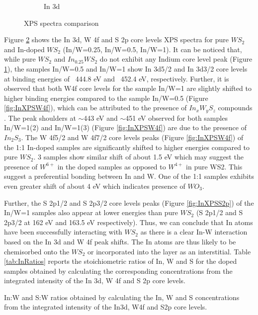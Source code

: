 \begin{figure}[!h]
\begin{center}
\begin{subfigure}[b]{0.6\textwidth}
			\caption{In 3d}
			\label{fig:InXPSIn3d}
		\end{subfigure}
		\caption{XPS spectra comparison}
		\label{fig:InXPSSpectra}
	\end{center}
\end{figure}

Figure \ref{fig:InXPSSpectra} shows the In 3d, W 4f and S 2p core levels XPS spectra for pure $WS_2$ and In-doped $WS_2$ (In/W=0.25, In/W=0.5, In/W=1). It can be noticed that, while pure $WS_2$ and $In_{0.25}WS_2$ do not exhibit any Indium core level peak (Figure \ref{fig:InXPSIn3d}), the samples In/W=0.5 and In/W=1 show In 3d5/2 and In 3d3/2 core levels at binding energies of ~444.8 eV and ~452.4 eV, respectively. Further, it is observed that both W4f core levels for the sample In/W=1 are slightly shifted to higher binding energies compared to the sample In/W=0.5 (Figure \ref{fig:InXPSW4f}), which can be attributed to the presence of $In_xW_yS_z$ compounds \cite{Wagner1991}. The peak shoulders at $\sim$443 eV and $\sim$451 eV observed for both samples In/W=1(2) and In/W=1(3) (Figure \ref{fig:InXPSW4f}) are due to the presence of $In_2S_3$. The W 4f5/2 and W 4f7/2 core levels peaks (Figure \ref{fig:InXPSW4f}) of the 1:1 In-doped samples are significantly shifted to higher energies compared to pure $WS_2$. 3 samples show similar shift of about 1.5 eV which may suggest the presence of $W^{6+}$ in the doped samples as opposed to $W^{4+}$ in pure WS2. This suggest a preferential bonding between In and W. One of the 1:1 samples exhibits even greater shift of about 4 eV which indicates presence of $WO_3$. 

Further, the S 2p1/2 and S 2p3/2 core levels peaks (Figure \ref{fig:InXPSS2p}) of the In/W=1 samples also appear at lower energies than pure $WS_2$ (S 2p1/2 and S 2p3/2 at 162 eV and 163.5 eV respectively). Thus, we can conclude that In atoms have been successfully interacting with $WS_2$ as there is a clear In-W interaction based on the In 3d and W 4f peak shifts. The In atoms are thus likely to be chemisorbed onto the $WS_2$ or incorporated into the layer as an interstitial. Table \ref{tab:InRatios} reports the stoichiometric ratios of In, W and S for the doped samples obtained by calculating the corresponding concentrations from the integrated intensity of the In 3d, W 4f and S 2p core levels. 

\begin{table}[!ht]
\caption{In:W and S:W ratios obtained by calculating the In, W and S concentrations from the integrated intensity of the In3d, W4f and S2p core levels.}
\label{tab:InRatios}
\end{table}

